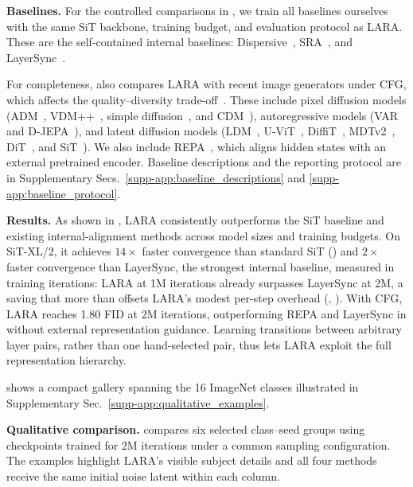 \noindent\textbf{Baselines.}
For the controlled comparisons in , we train all baselines ourselves with the same SiT backbone, training budget, and evaluation protocol as LARA. These are the self-contained internal baselines: Dispersive~\citep{wang2025dispersive}, SRA~\citep{jiang2025sra}, and LayerSync~\citep{haghighi2026layersync}.

For completeness,  also compares LARA with recent image generators under CFG, which affects the quality--diversity trade-off~\citep{kynkaanniemi2024guidance}. These include pixel diffusion models (ADM~\citep{dhariwal2021diffusion}, VDM++~\citep{kingma2023understanding}, simple diffusion~\citep{hoogeboom2023simple}, and CDM~\citep{ho2022cascaded}), autoregressive models (VAR~\citep{tian2024visual} and D-JEPA~\citep{chen2024jepa}), and latent diffusion models (LDM~\citep{rombach2022ldm}, U-ViT~\citep{bao2023all}, DiffiT~\citep{hatamizadeh2024diffit}, MDTv2~\citep{gao2023mdtv2}, DiT~\citep{peebles2023scalable}, and SiT~\citep{ma2024sit}). We also include REPA~\citep{yu2024repa}, which aligns hidden states with an external pretrained encoder. Baseline descriptions and the reporting protocol are in Supplementary Secs.~\ref{supp-app:baseline_descriptions} and \ref{supp-app:baseline_protocol}.

\noindent\textbf{Results.}
As shown in , LARA consistently outperforms the SiT baseline and existing internal-alignment methods across model sizes and training budgets. On SiT-XL/2, it achieves $14\times$ faster convergence than standard SiT () and $2\times$ faster convergence than LayerSync, the strongest internal baseline, measured in training iterations: LARA at 1M iterations already surpasses LayerSync at 2M, a saving that more than offsets LARA's modest per-step overhead (, ). With CFG, LARA reaches 1.80 FID at 2M iterations, outperforming REPA and LayerSync in  without external representation guidance. Learning transitions between arbitrary layer pairs, rather than one hand-selected pair, thus lets LARA exploit the full representation hierarchy.

 shows a compact gallery spanning the 16 ImageNet classes illustrated in Supplementary Sec.~\ref{supp-app:qualitative_examples}.

\noindent\textbf{Qualitative comparison.}
 compares six selected class--seed groups using checkpoints trained for $2\mathrm{M}$ iterations under a common sampling configuration. The examples highlight LARA's visible subject details and all four methods receive the same initial noise latent within each column.

